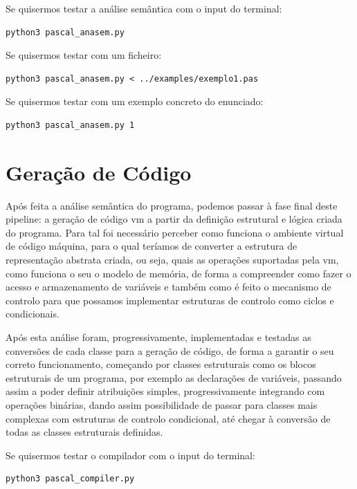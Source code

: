 \documentclass[12pt,a4paper]{report}
\begin{document}
\vspace{1em}

Se quisermos testar a análise semântica com o input do terminal:
\begin{verbatim}
python3 pascal_anasem.py
\end{verbatim}

Se quisermos testar com um ficheiro:
\begin{verbatim}
python3 pascal_anasem.py < ../examples/exemplo1.pas
\end{verbatim}

Se quisermos testar com um exemplo concreto do enunciado:
\begin{verbatim}
python3 pascal_anasem.py 1
\end{verbatim}

\chapter{Geração de Código}

Após feita a análise semântica do programa, podemos passar à fase final deste pipeline: a geração de código vm a partir da definição estrutural e lógica criada do programa.
Para tal foi necessário perceber como funciona o ambiente virtual de código máquina, para o qual teríamos de converter a estrutura de representação abstrata criada, ou seja,
quais as operações suportadas pela vm, como funciona o seu o modelo de memória, de forma a compreender como fazer o acesso e armazenamento de variáveis e também como é feito o mecanismo de controlo
para que possamos implementar estruturas de controlo como ciclos e condicionais.

Após esta análise foram, progressivamente, implementadas e testadas as conversões de cada classe para a geração de código, de forma a garantir o seu correto funcionamento, começando por classes estruturais
como os blocos estruturais de um programa, por exemplo as declarações de variáveis, passando assim a poder definir atribuições simples, progressivamente integrando com operações binárias, dando assim possibilidade
de passar para classes mais complexas com estruturas de controlo condicional, até chegar à conversão de todas as classes estruturais definidas.

\vspace{1em}

Se quisermos testar o compilador com o input do terminal:
\begin{verbatim}
python3 pascal_compiler.py
\end{verbatim}
\end{document}
